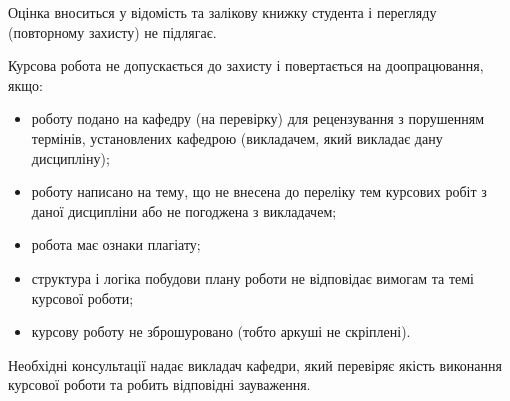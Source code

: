 Оцінка вноситься у відомість та залікову книжку студента і перегляду (повторному захисту) не підлягає.

Курсова робота не допускається до захисту і повертається на доопрацювання, якщо:
\begin{itemize}
\item роботу подано на кафедру (на перевірку) для рецензування з порушенням термінів, установлених кафедрою (викладачем, який викладає дану дисципліну);
\item роботу написано на тему, що не внесена до переліку тем курсових робіт з даної дисципліни або не погоджена з викладачем;
\item робота має ознаки плагіату;
\item структура і логіка побудови плану роботи не відповідає вимогам та темі курсової роботи;
\item курсову роботу не зброшуровано (тобто аркуші не скріплені).
\end{itemize}

Необхідні консультації надає викладач кафедри, який перевіряє якість виконання курсової роботи та робить відповідні зауваження.